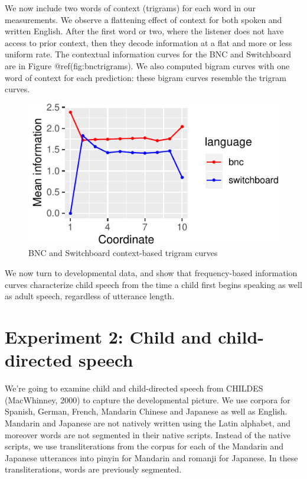\documentclass[10pt, letterpaper]{article}
\newenvironment{CodeChunk}{}{}
\begin{document}
We now include two words of context (trigrams) for each word in our
measurements. We observe a flattening effect of context for both spoken
and written English. After the first word or two, where the listener
does not have access to prior context, then they decode information at a
flat and more or less uniform rate. The contextual information curves
for the BNC and Switchboard are in Figure @ref(fig:bnctrigrams). We also
computed bigram curves with one word of context for each prediction:
these bigram curves resemble the trigram curves.

\begin{CodeChunk}
\begin{figure}[tb]
\includegraphics{figs/bnctrigrams-1} \caption[BNC and Switchboard context-based trigram curves]{BNC and Switchboard context-based trigram curves}\label{fig:bnctrigrams}
\end{figure}
\end{CodeChunk}

We now turn to developmental data, and show that frequency-based
information curves characterize child speech from the time a child first
begins speaking as well as adult speech, regardless of utterance length.

\hypertarget{experiment-2-child-and-child-directed-speech}{%
\section{Experiment 2: Child and child-directed
speech}\label{experiment-2-child-and-child-directed-speech}}

We're going to examine child and child-directed speech from CHILDES
(MacWhinney, 2000) to capture the developmental picture. We use corpora
for Spanish, German, French, Mandarin Chinese and Japanese as well as
English. Mandarin and Japanese are not natively written using the Latin
alphabet, and moreover words are not segmented in their native scripts.
Instead of the native scripts, we use transliterations from the corpus
for each of the Mandarin and Japanese utterances into pinyin for
Mandarin and romanji for Japanese. In these transliterations, words are
previously segmented.
\end{document}
